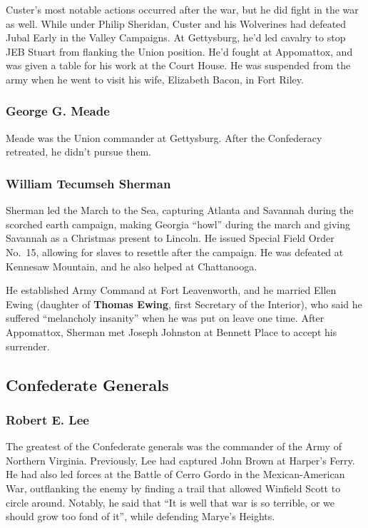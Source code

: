 Custer's most notable actions occurred after the war, but he did fight in the war as well.
While under Philip Sheridan, Custer and his Wolverines had defeated Jubal Early in the Valley Campaigns.
At Gettysburg, he'd led cavalry to stop JEB Stuart from flanking the Union position.
He'd fought at Appomattox, and was given a table for his work at the Court House.
He was suspended from the army when he went to visit his wife, Elizabeth Bacon, in Fort Riley.

\subsubsection*{George G. Meade}

Meade was the Union commander at Gettysburg.
After the Confederacy retreated, he didn't pursue them.

\subsubsection*{William Tecumseh Sherman}

Sherman led the March to the Sea, capturing Atlanta and Savannah during the scorched earth campaign,
making Georgia ``howl'' during the march and giving Savannah as a Christmas present to Lincoln.
He issued Special Field Order No.\ 15, allowing for slaves to resettle after the campaign.
He was defeated at Kennesaw Mountain, and he also helped at Chattanooga.

He established Army Command at Fort Leavenworth, and he married Ellen Ewing
(daughter of \textbf{Thomas Ewing}, first Secretary of the Interior),
who said he suffered ``melancholy insanity'' when he was put on leave one time.
After Appomattox, Sherman met Joseph Johnston at Bennett Place to accept his surrender.

\subsection*{Confederate Generals}

\subsubsection*{Robert E. Lee}

The greatest of the Confederate generals was the commander of the Army of Northern Virginia.
Previously, Lee had captured John Brown at Harper's Ferry.
He had also led forces at the Battle of Cerro Gordo in the Mexican-American War,
outflanking the enemy by finding a trail that allowed Winfield Scott to circle around.
Notably, he said that ``It is well that war is so terrible, or we should grow too fond of it'',
while defending Marye's Heights.


